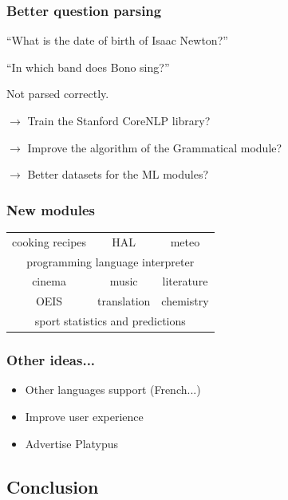 \begin{frame}
    \frametitle{Better question parsing}

    ``What is the date of birth of Isaac Newton?''

    ``In which band does Bono sing?''

    Not parsed correctly.

    \medbreak

    $\rightarrow$ Train the Stanford CoreNLP library?

    $\rightarrow$ Improve the algorithm of the Grammatical module?

    $\rightarrow$ Better datasets for the ML modules?
\end{frame}

\begin{frame}
    \frametitle{New modules}
    \begin{table}
    \Large
    \centering
    \begin{tabular}{ccc}
        \textcolor{mLightBrown}{cooking recipes} & \textcolor{mDarkBrown}{HAL} & \textcolor{mMediumBrown}{meteo} \\
        \multicolumn{3}{c}{\textcolor{mDarkTeal}{programming language interpreter}} \\
        \textcolor{mMediumBrown}{cinema} & \textcolor{mDarkTeal}{music} & \textcolor{mLightBrown}{literature}\\
        \textcolor{mDarkBrown}{OEIS} & \textcolor{mLightBrown}{translation} & \textcolor{mDarkTeal}{chemistry}\\
        \multicolumn{3}{c}{\textcolor{mMediumBrown}{sport statistics and predictions}} \\
    \end{tabular}
    \end{table}
\end{frame}

\begin{frame}
    \frametitle{Other ideas...}

    \begin{itemize}
        \item Other languages support (French...)
        \item Improve user experience
        \item Advertise \alert{Platypus}
    \end{itemize}
\end{frame}

\subsection{Conclusion}

